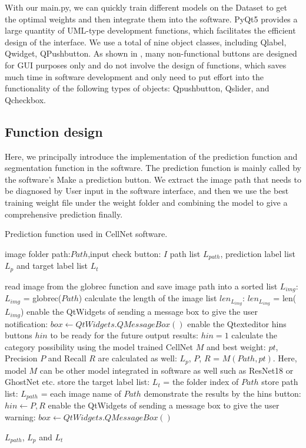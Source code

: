 With our main.py, we can quickly train different models on the Dataset to get the optimal weights and then integrate them into the software. PyQt5 provides a large quantity of UML-type development functions, which facilitates the efficient design of the interface. We use a total of nine object classes, including Qlabel, Qwidget, QPushbutton. As shown in \eg{}, many non-functional buttons are designed for GUI purposes only and do not involve the design of functions, which saves much time in software development and only need to put effort into the functionality of the following types of objects: Qpushbutton, Qslider, and Qcheckbox.


\subsection{Function design} %
\label{sub:amet}
Here, we principally introduce the implementation of the prediction function and segmentation function in the software. The prediction function is mainly called by the software's Make a prediction button. We extract the image path that needs to be diagnosed by User input in the software interface, and then we use the best training weight file under the weight folder and combining the model to give a comprehensive prediction finally.


\begin{algorithm}[b]
  \caption{Prediction function used in CellNet software.}
  \label{alg:Framwork}
  \begin{algorithmic}[1]
    \Require
    image folder path:$Path$,input check button: $I$
    \Ensure
     path list $L_{path}$, prediction label list $L_{p}$ and target label list $L_{t}$
  
      \State  read image from the globrec function and save image path into a sorted list $L_{img}$: $L_{img}$ = globrec($Path$)
      \State  calculate the length of the image list $len_{L_{img}}$: $len_{L_{img}}$ = len($L_{img}$)
      \State  enable the QtWidgets of sending a message box to give the user notification: $box  \gets QtWidgets.QMessageBox()$
      \State  enable the Qtexteditor  hins buttons $hin$ to be ready for the future output results: $ hin = 1$
      \State  calculate the category possibility using the model trained CellNet $M$ and best weight: $pt$, Precision $P$ and Recall $R$ are calculated as well: $L_{p}$, $P$, $R$ = $M(Path,pt)$. Here, model $M$ can be other model integrated in software as well such as ResNet18 or GhostNet etc.
      \State  store the target label list: $L_{t}$ = the folder index of $Path$
      \State  store path list: $L_{path}$ = each image name of $Path$
      \State  demonstrate the results by the hins button: $hin  \gets P, R$
    \Else
      \State  enable the QtWidgets of sending a message box to give the user warning: $box  \gets QtWidgets.QMessageBox()$
      
    \EndIf \newline
   \Return  $L_{path}$, $L_{p}$ and $L_{t}$
  \end{algorithmic}
\end{algorithm}



